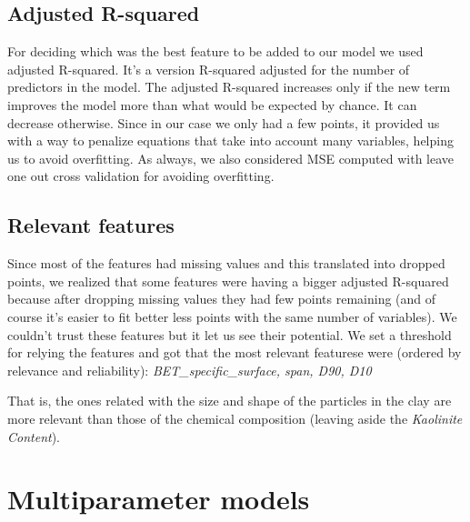\documentclass[10pt,conference,compsocconf]{IEEEtran}
\begin{document}
\subsection{Adjusted R-squared}
For deciding which was the best feature to be added to our model we used adjusted R-squared. It's a version R-squared adjusted for the number of predictors in the model. The adjusted R-squared increases only if the new term improves the model more than what would be expected by chance. It can decrease otherwise. Since in our case we only had a few points, it provided us with a way to penalize equations that take into account many variables, helping us to avoid overfitting. As always, we also considered MSE computed with leave one out cross validation for avoiding overfitting.

\subsection{Relevant features}
Since most of the features had missing values and this translated into dropped points, we realized that some features were having a bigger adjusted R-squared because after dropping missing values they had few points remaining (and of course it's easier to fit better less points with the same number of variables). We couldn't trust these features but it let us see their potential. We set a threshold for relying the features and got that the most relevant featurese were (ordered by relevance and reliability):
\textit{BET\_specific\_surface, span, D90, D10}

That is, the ones related with the size and shape of the particles in the clay are more relevant than those of the chemical composition (leaving aside the \textit{Kaolinite Content}).

\section{Multiparameter models}

\end{document}
